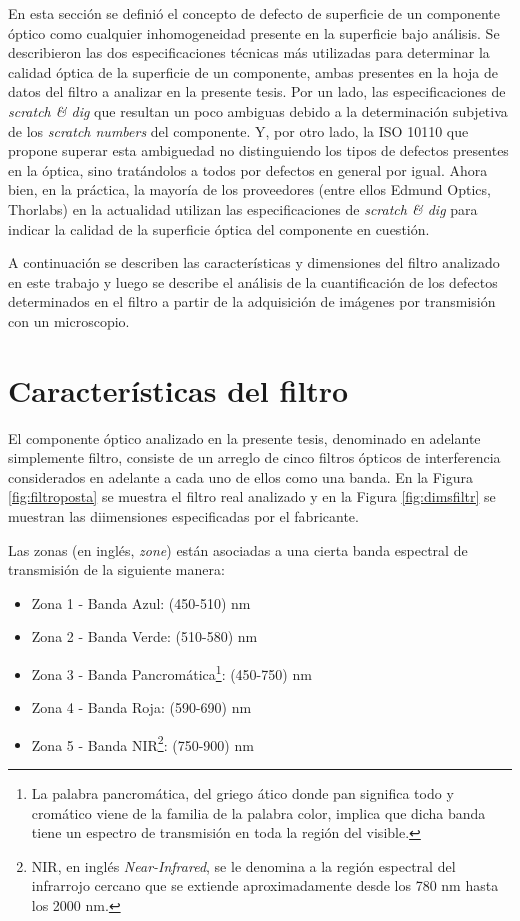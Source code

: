  En esta sección se definió el concepto de defecto de superficie de un componente óptico como cualquier inhomogeneidad presente en la superficie bajo análisis. Se describieron las dos especificaciones técnicas más utilizadas para determinar la calidad óptica de la superficie de un componente, ambas presentes en la hoja de datos del filtro a analizar en la presente tesis. Por un lado, las especificaciones de \textit{scratch \& dig} que resultan un poco ambiguas debido a la determinación subjetiva de los \textit{scratch numbers} del componente. Y, por otro lado, la ISO 10110 que propone superar esta ambiguedad no distinguiendo los tipos de defectos presentes en la óptica, sino tratándolos a todos por defectos en general por igual. Ahora bien, en la práctica, la mayoría de los proveedores (entre ellos Edmund Optics, Thorlabs) en la actualidad utilizan las especificaciones de \textit{scratch \& dig} para indicar la calidad de la superficie óptica del componente en cuestión. 
 
 A continuación se describen las características y dimensiones del filtro analizado en este trabajo y luego se describe el análisis de la cuantificación de los defectos determinados en el filtro a partir de la adquisición de imágenes por transmisión con un microscopio.

\singlespacing
\section{Características del filtro}

\hspace{0.5cm}El componente óptico analizado en la presente tesis, denominado en adelante simplemente filtro, consiste de un arreglo de cinco filtros ópticos de interferencia  considerados en adelante a cada uno de ellos como una banda. En la Figura \ref{fig:filtroposta} se muestra el filtro real analizado y en la Figura \ref{fig:dimsfiltr} se muestran las diimensiones especificadas por el fabricante.

Las zonas (en inglés, \textit{zone}) están asociadas a una cierta banda espectral de transmisión de la siguiente manera:
\begin{itemize}
\item Zona 1 - Banda Azul: (450-510) nm
\item Zona 2 - Banda Verde: (510-580) nm
\item Zona 3 - Banda Pancromática\footnote{La palabra pancromática, del griego ático donde pan significa todo y cromático viene de la familia de la palabra color, implica que dicha banda tiene un espectro de transmisión en toda la región del visible.}: (450-750) nm
\item Zona 4 - Banda Roja: (590-690) nm
\item Zona 5 - Banda NIR\footnote{NIR, en inglés \textit{Near-Infrared}, se le denomina a la región espectral del infrarrojo cercano que se extiende aproximadamente desde los 780 nm hasta los 2000 nm.}: (750-900) nm
\end{itemize}
 


